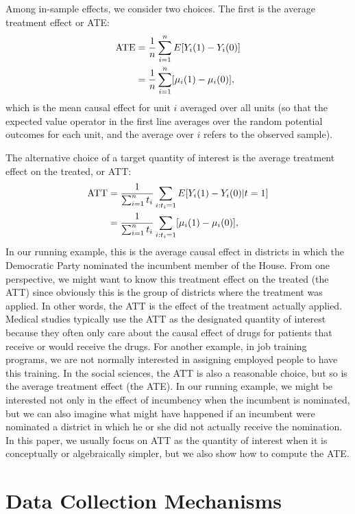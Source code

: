 \documentclass[11pt,titlepage]{article}
\begin{document}
Among in-sample effects, we consider two choices.  The first is the
average treatment effect or ATE:
\begin{align}
  \label{pate}
  \text{ATE} & = \frac{1}{n}\sum_{i=1}^n E[Y_i(1) - Y_i(0)] \notag\\
  &  = \frac{1}{n}\sum_{i=1}^n[\mu_i(1) - \mu_i(0)],
\end{align}
which is the mean causal effect for unit $i$ averaged over all units
(so that the expected value operator in the first line averages over
the random potential outcomes for each unit, and the average over $i$
refers to the observed sample).

The alternative choice of a target quantity of interest is the average
treatment effect on the treated, or ATT:
\begin{align}
  \label{att}
  \text{ATT} & = \frac{1}{\sum_{i=1}^n t_i}\sum_{i:t_i=1} E[Y_i(1) - Y_i(0)|t=1] \notag\\
  & = \frac{1}{\sum_{i=1}^n t_i}\sum_{i:t_i=1}[\mu_i(1) - \mu_i(0)],
\end{align}
In our running example, this is the average causal effect in districts
in which the Democratic Party nominated the incumbent member of the
House.  From one perspective, we might want to know this treatment
effect on the treated (the ATT) since obviously this is the group of
districts where the treatment was applied.  In other words, the ATT is
the effect of the treatment actually applied.  Medical studies
typically use the ATT as the designated quantity of interest because
they often only care about the causal effect of drugs for patients
that receive or would receive the drugs.  For another example, in job
training programs, we are not normally interested in assigning
employed people to have this training.  In the social sciences, the
ATT is also a reasonable choice, but so is the average treatment
effect (the ATE).  In our running example, we might be interested not
only in the effect of incumbency when the incumbent is nominated,
but we can also imagine what might have happened if an incumbent were
nominated a district in which he or she did not actually receive the
nomination.  In this paper, we usually focus on ATT as the quantity of
interest when it is conceptually or algebraically simpler, but we also
show how to compute the ATE.

\section{Data Collection Mechanisms}
\end{document}
